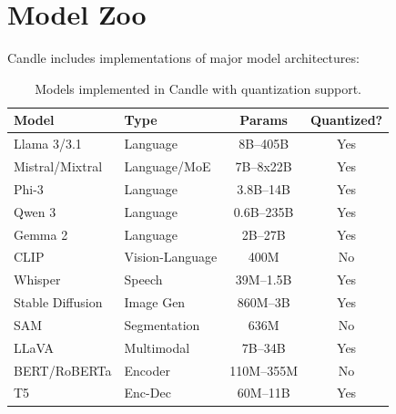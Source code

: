 \section{Model Zoo}

\label{sec:zoo}

Candle includes implementations of major model architectures:

\begin{table}[H]
\centering
\small
\begin{tabular}{llcc}
\toprule
\textbf{Model} & \textbf{Type} & \textbf{Params} & \textbf{Quantized?} \\
\midrule
Llama 3/3.1 & Language & 8B--405B & Yes \\
Mistral/Mixtral & Language/MoE & 7B--8x22B & Yes \\
Phi-3 & Language & 3.8B--14B & Yes \\
Qwen 3 & Language & 0.6B--235B & Yes \\
Gemma 2 & Language & 2B--27B & Yes \\
CLIP & Vision-Language & 400M & No \\
Whisper & Speech & 39M--1.5B & Yes \\
Stable Diffusion & Image Gen & 860M--3B & Yes \\
SAM & Segmentation & 636M & No \\
LLaVA & Multimodal & 7B--34B & Yes \\
BERT/RoBERTa & Encoder & 110M--355M & No \\
T5 & Enc-Dec & 60M--11B & Yes \\
\bottomrule
\end{tabular}
\caption{Models implemented in Candle with quantization support.}
\label{tab:models}
\end{table}

